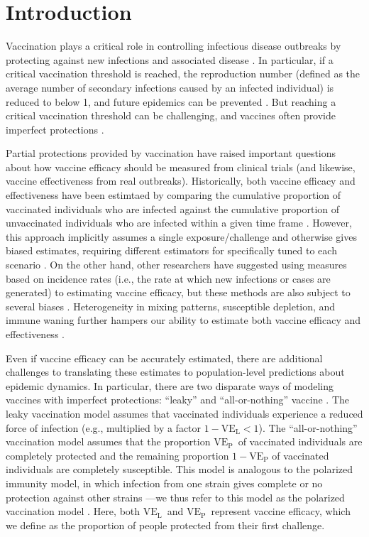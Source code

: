 \documentclass[12pt]{article}
\newcommand{\VE}{\ensuremath{\mathrm{VE}}}
\newcommand{\VEP}{\ensuremath{\VE_{\mathrm{P}}}}
\newcommand{\VEL}{\ensuremath{\VE_{\mathrm{L}}}}
\begin{document}
\pagebreak

\section*{Introduction}

Vaccination plays a critical role in controlling infectious disease outbreaks by protecting against new infections and associated disease \citep{iwasaki2020and}.
In particular, if a critical vaccination threshold is reached, the reproduction number (defined as the average number of secondary infections caused by an infected individual) is reduced to below 1, and future epidemics can be prevented \citep{anderson1985vaccination}.
But reaching a critical vaccination threshold can be challenging, and vaccines often provide imperfect protections \citep{gandon2003imperfect,anderson2020challenges}.

Partial protections provided by vaccination have raised important questions about how vaccine efficacy should be measured from clinical trials (and likewise, vaccine effectiveness from real outbreaks).
Historically, both vaccine efficacy and effectiveness have been estimtaed by comparing the cumulative proportion of vaccinated individuals who are infected against the cumulative proportion of unvaccinated individuals who are infected within a given time frame \citep{farrington1993estimation}.
However, this approach implicitly assumes a single exposure/challenge and otherwise gives biased estimates, requiring different estimators for specifically tuned to each scenario \citep{halloran1991direct}.
On the other hand, other researchers have suggested using measures based on incidence rates (i.e., the rate at which new infections or cases are generated) to estimating vaccine efficacy, but these methods are also subject to several biases \citep{rinta2009estimation,lipsitch2021interpreting}.
Heterogeneity in mixing patterns, susceptible depletion, and immune waning further hampers our ability to estimate both vaccine efficacy and effectiveness \citep{halloran1992interpretation,lipsitch2019challenges,kahn2022identifying}.

Even if vaccine efficacy can be accurately estimated, there are additional challenges to translating these estimates to population-level predictions about epidemic dynamics.
In particular, there are two disparate ways of modeling vaccines with imperfect protections: ``leaky'' and ``all-or-nothing'' vaccine \citep{smith1984assessment}.
The leaky vaccination model assumes that vaccinated individuals experience a reduced force of infection (e.g., multiplied by a factor $1-\VEL < 1$).
The ``all-or-nothing'' vaccination model assumes that the proportion \VEP\ of vaccinated individuals are completely protected and the remaining proportion $1-\VEP$ of vaccinated individuals are completely susceptible.
This model is analogous to the polarized immunity model, in which infection from one strain gives complete or no protection against other strains \citep{gog2002dynamics}---we thus refer to this model as the polarized vaccination model \citep{gomes2014missing}.
Here, both \VEL\ and \VEP\ represent vaccine efficacy, which we define as the proportion of people protected from their first challenge.
\end{document}
